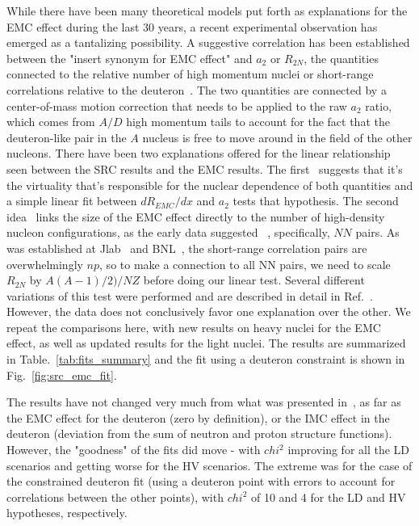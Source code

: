 While there have been many theoretical models put forth as explanations for
the EMC effect during the last 30 years, a recent experimental observation has
emerged as a tantalizing possibility.  A suggestive correlation has been
established between the "insert synonym for EMC effect" and $a_2$ or $R_{2N}$,
the quantities connected to the relative number of high momentum nuclei or
short-range correlations relative to the deuteron~\cite{weinstein11, hen13,
arrington12c}.  The two quantities are connected by a center-of-mass motion
correction that needs to be applied to the raw $a_2$ ratio, which comes from
$A/D$ high momentum tails to account for the fact that the deuteron-like pair
in the $A$ nucleus is free to move around in the field of the other nucleons.
There have been two explanations offered for the linear relationship seen
between the SRC results and the EMC results.  The first~\cite{weinstein11}
suggests that it's the virtuality that's responsible for the nuclear
dependence of both quantities and a simple linear fit between $dR_{EMC}/dx$
and $a_2$ tests that hypothesis.  The second idea~\cite{arrington12c} links
the size of the EMC effect directly to the number of high-density nucleon
configurations, as the early data suggested ~\cite{seely09}, specifically,
$NN$ pairs.  As was established at Jlab~\cite{subedi08} and
BNL~\cite{piasetzky06}, the short-range correlation pairs are
overwhelmingly $np$, so to make a connection to all NN pairs, we need to scale
$R_{2N}$ by $A(A-1)/2)/NZ$ before doing our linear test. Several different
variations of this test were performed and are described in detail in
Ref.~\cite{arrington12c}.  However, the data does not conclusively favor one
explanation over the other.  We repeat the comparisons here, with new results
on heavy nuclei for the EMC effect, as well as updated results for the light
nuclei.  The results are summarized in Table.~\ref{tab:fits_summary} and the
fit using a deuteron constraint is shown in Fig.~\ref{fig:src_emc_fit}.

The results have not changed very much from what was presented
in~\cite{arrington12c}, as far as the EMC effect for the deuteron (zero by
definition), or the IMC effect in the deuteron (deviation from the sum of
neutron and proton structure functions).  However, the "goodness" of the fits
did move - with $chi^2$ improving for all the LD scenarios and getting worse
for the HV scenarios.  The extreme was for the case of the constrained
deuteron fit (using a deuteron point with errors to account for correlations
between the other points), with $chi^2$ of 10 and 4 for the LD and HV
hypotheses, respectively.


